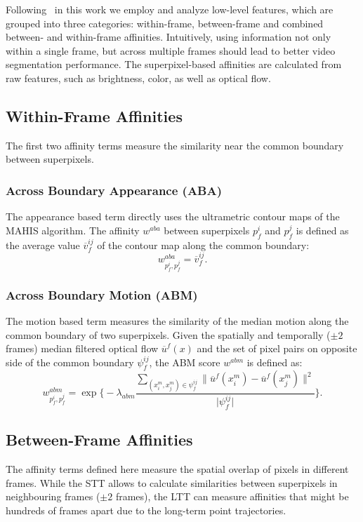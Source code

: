 Following~\cite{GalassoCS12} in this work we employ and analyze low-level features, which are grouped into three categories:
within-frame, between-frame and combined between- and within-frame affinities. Intuitively, using information not only within a single frame, but across multiple frames should lead to better video segmentation performance.
The superpixel-based affinities are calculated from raw features, such as brightness, color, as well as optical flow.
\subsection{Within-Frame Affinities}
The first two affinity terms measure the similarity near the common boundary between superpixels.
\subsubsection*{Across Boundary Appearance (ABA)}
The appearance based term directly uses the ultrametric contour maps of the MAHIS algorithm. The affinity $w^{aba}$ between superpixels $p_f^i$ and $p_f^j$ is defined as the average value $\overline{v}_f^{ij}$ of the contour map along
the common boundary:
\begin{equation*}
 w^{aba}_{p_f^i,p_f^j} = \overline{v}_f^{ij}.
\end{equation*}
\subsubsection*{Across Boundary Motion (ABM)}
The motion based term measures the similarity of the median motion along the common boundary of two superpixels. Given the spatially and temporally ($\pm2$ frames) median filtered optical flow $\overline{u}^f(x)$ and the set of pixel
pairs on opposite side of the common boundary $\psi_f^{ij}$, the ABM score $w^{abm}$ is defined as:
\begin{equation*}
 w^{abm}_{p_f^i,p_f^j} = \exp {\Biggl \{ -\lambda_{abm} \frac{ \sum_{(x_i^m,x_j^m) \in \psi_f^{ij}} \lVert \overline{u}^f(x_i^m) - \overline{u}^f(x_j^m) \rVert^2}{\lvert \psi_f^{ij} \rvert} \Biggr\}}.
\end{equation*}   
\subsection{Between-Frame Affinities}
The affinity terms defined here measure the spatial overlap of pixels in different frames. While the STT allows to calculate similarities between superpixels in neighbouring frames ($\pm2$ frames), the LTT can measure
affinities that might be hundreds of frames apart due to the long-term point trajectories.
